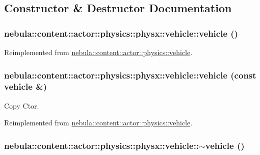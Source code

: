 \subsection{Constructor \& Destructor Documentation}
\hypertarget{classnebula_1_1content_1_1actor_1_1physics_1_1physx_1_1vehicle_a9a55030c4dab2fd9cdff37534685827d}{
\subsubsection[{vehicle}]{\setlength{\rightskip}{0pt plus 5cm}nebula::content::actor::physics::physx::vehicle::vehicle ()}}
\label{classnebula_1_1content_1_1actor_1_1physics_1_1physx_1_1vehicle_a9a55030c4dab2fd9cdff37534685827d}


Reimplemented from \hyperlink{classnebula_1_1content_1_1actor_1_1physics_1_1vehicle_aaceeb5f53c1dcb1199e1564e2132748b}{nebula::content::actor::physics::vehicle}.\hypertarget{classnebula_1_1content_1_1actor_1_1physics_1_1physx_1_1vehicle_ade813048c13ef94a737be799b483bddd}{
\subsubsection[{vehicle}]{\setlength{\rightskip}{0pt plus 5cm}nebula::content::actor::physics::physx::vehicle::vehicle (const {\bf vehicle} \&)}}
\label{classnebula_1_1content_1_1actor_1_1physics_1_1physx_1_1vehicle_ade813048c13ef94a737be799b483bddd}


Copy Ctor. 

Reimplemented from \hyperlink{classnebula_1_1content_1_1actor_1_1physics_1_1vehicle_a756405424b4357fa43c473213b7afe04}{nebula::content::actor::physics::vehicle}.\hypertarget{classnebula_1_1content_1_1actor_1_1physics_1_1physx_1_1vehicle_a4a78a78751e0a35e62826e50f18b4e16}{
\subsubsection[{$\sim$vehicle}]{\setlength{\rightskip}{0pt plus 5cm}nebula::content::actor::physics::physx::vehicle::$\sim$vehicle ()}}
\label{classnebula_1_1content_1_1actor_1_1physics_1_1physx_1_1vehicle_a4a78a78751e0a35e62826e50f18b4e16}


